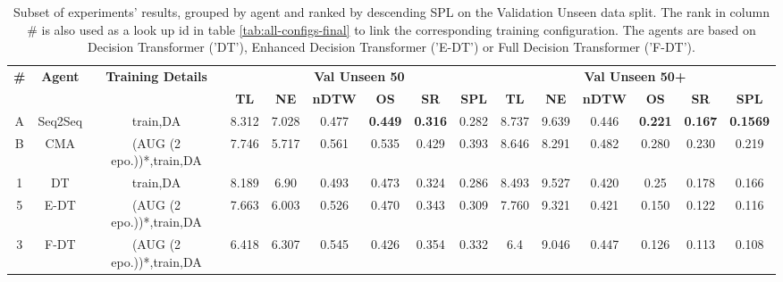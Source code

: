 \begin{table}
\centering
\caption{\label{tab:best_unseen_50}Subset of experiments' results, grouped by agent and ranked by descending SPL on the Validation Unseen data split. The rank in column \# is also used as a look up id in table \ref{tab:all-configs-final} to link the corresponding training configuration.     \newline The agents are based on Decision Transformer ('DT'), Enhanced Decision Transformer ('E-DT') or Full Decision Transformer ('F-DT').}
\begin{tabular}{@{\hskip3pt}c@{\hskip3pt}c@{\hskip3pt}c@{\hskip3pt}c@{\hskip3pt}c@{\hskip3pt}c@{\hskip3pt}c@{\hskip3pt}c@{\hskip3pt}c@{\hskip3pt}c@{\hskip3pt}c@{\hskip3pt}c@{\hskip3pt}c@{\hskip3pt}c@{\hskip3pt}c}
\toprule
\textbf{\#} & \textbf{Agent} & \textbf{Training Details} & \multicolumn{6}{c}{\textbf{Val Unseen 50}} & \multicolumn{6}{c}{\textbf{Val Unseen 50+}} \\
 \textbf{~} &     \textbf{~} &                \textbf{~} &       \textbf{TL} &    \textbf{NE} &   \textbf{nDTW} &     \textbf{OS} &    \textbf{SR} &    \textbf{SPL} &         \textbf{TL} &     \textbf{NE} &   \textbf{nDTW} &     \textbf{OS} &    \textbf{SR} &    \textbf{SPL} \\
          A &             Seq2Seq &                  train,DA &             8.312 &          7.028 &           0.477 &  \textbf{0.449} &  \textbf{0.316} &           0.282 &                8.737 &           9.639 &           0.446 &  \textbf{0.221} &  \textbf{0.167} &  \textbf{0.1569} \\
          B &           CMA &  (AUG (2 epo.))*,train,DA &             7.746 &          5.717 &           0.561 &           0.535 &          0.429 &           0.393 &               8.646 &           8.291 &           0.482 &           0.280 &          0.230 &           0.219 \\
\midrule
          1 &             DT &                  train,DA &             8.189 &          6.90 &           0.493 &  0.473 &  0.324 &           0.286 &                8.493 &           9.527 &          0.420 &  0.25 &  0.178 &  0.166 \\
          5 &           E-DT &  (AUG (2 epo.))*,train,DA &             7.663 &          6.003 &           0.526 &           0.470 &          0.343 &           0.309 &               7.760 &           9.321 &           0.421 &           0.150 &          0.122 &           0.116 \\
          3 &           F-DT &  (AUG (2 epo.))*,train,DA &              6.418 &  6.307 &  0.545 &           0.426 &          0.354 &  0.332 &                 6.4 &  9.046 &  0.447 &           0.126 &          0.113 &           0.108 \\
\bottomrule
\end{tabular}
\end{table}
